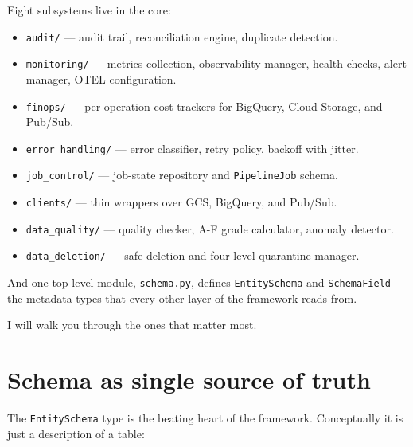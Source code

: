 \documentclass[
  11pt,
  british,
  oneside]{book}
\providecommand{\tightlist}{%
  \setlength{\itemsep}{0pt}\setlength{\parskip}{0pt}}
\begin{document}
\FloatBarrier

Eight subsystems live in the core:

\begin{itemize}
\tightlist
\item
  \texttt{audit/} --- audit trail, reconciliation
  engine, duplicate detection.
\item
  \texttt{monitoring/} --- metrics collection,
  observability manager, health checks, alert
  manager, OTEL configuration.
\item
  \texttt{finops/} --- per-operation cost trackers for BigQuery, Cloud
  Storage, and Pub/Sub.
\item
  \texttt{error\_handling/} --- error
  classifier, retry
  policy, backoff with jitter.
\item
  \texttt{job\_control/} --- job-state repository and
  \texttt{PipelineJob} schema.
\item
  \texttt{clients/} --- thin wrappers over GCS, BigQuery, and Pub/Sub.
\item
  \texttt{data\_quality/} --- quality checker, A-F grade calculator,
  anomaly detector.
\item
  \texttt{data\_deletion/} --- safe deletion and four-level quarantine
  manager.
\end{itemize}

And one top-level module, \texttt{schema.py}, defines
\texttt{EntitySchema} and \texttt{SchemaField} --- the metadata types
that every other layer of the framework reads from.

I will walk you through the ones that matter most.

\hypertarget{schema-as-single-source-of-truth}{%
\section{Schema as single source of
truth}\label{schema-as-single-source-of-truth}}

The \texttt{EntitySchema} type is the beating heart of the
framework. Conceptually it is just a description of a
table:
\end{document}
